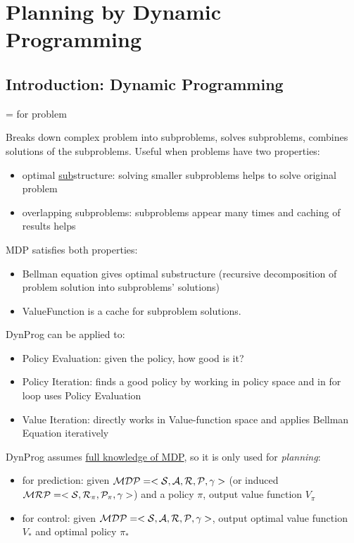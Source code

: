 \section{Planning by Dynamic Programming}

\subsection{Introduction: Dynamic Programming}
  =  for  problem

Breaks down complex problem into subproblems, solves subproblems, combines solutions of the subproblems. Useful when problems have two properties:
\begin{itemize}
	\item optimal \underline{sub}structure: solving smaller subproblems helps to solve original problem
	\item overlapping subproblems: subproblems appear many times and caching of results helps
\end{itemize}

MDP satisfies both properties:
\begin{itemize}
	\item Bellman equation gives optimal substructure (recursive decomposition of problem solution into subproblems' solutions)
	\item ValueFunction is a cache for subproblem solutions.
\end{itemize}

DynProg can be applied to: 
\begin{itemize}
	\item Policy Evaluation: given the policy, how good is it?
	\item Policy Iteration: finds a good policy by working in policy space and in for loop uses Policy Evaluation
	\item Value Iteration: directly works in Value-function space and applies Bellman Equation iteratively
\end{itemize}


DynProg assumes \underline{full knowledge of MDP}, so it is only used for \textit{planning}:
\begin{itemize}
	\item for prediction: given $\mathcal{MDP}=<\mathcal{S}, \mathcal{A}, \mathcal{R}, \mathcal{P}, \gamma>$ (or induced $\mathcal{MRP}=<\mathcal{S}, \mathcal{R}_\pi, \mathcal{P}_\pi, \gamma>$) and a policy $\pi$, output value function $V_\pi$
	\item for control: given $\mathcal{MDP}=<\mathcal{S}, \mathcal{A}, \mathcal{R}, \mathcal{P}, \gamma>$, output optimal value function $V_{*}$ and optimal policy $\pi_*$
\end{itemize}

